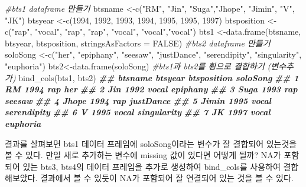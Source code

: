 \documentclass[
]{book}
\newenvironment{Shaded}{\begin{snugshade}}{\end{snugshade}}
\newcommand{\AttributeTok}[1]{\textcolor[rgb]{0.77,0.63,0.00}{#1}}
\newcommand{\CommentTok}[1]{\textcolor[rgb]{0.56,0.35,0.01}{\textit{#1}}}
\newcommand{\ConstantTok}[1]{\textcolor[rgb]{0.00,0.00,0.00}{#1}}
\newcommand{\DecValTok}[1]{\textcolor[rgb]{0.00,0.00,0.81}{#1}}
\newcommand{\DocumentationTok}[1]{\textcolor[rgb]{0.56,0.35,0.01}{\textbf{\textit{#1}}}}
\newcommand{\FunctionTok}[1]{\textcolor[rgb]{0.00,0.00,0.00}{#1}}
\newcommand{\NormalTok}[1]{#1}
\newcommand{\OtherTok}[1]{\textcolor[rgb]{0.56,0.35,0.01}{#1}}
\newcommand{\StringTok}[1]{\textcolor[rgb]{0.31,0.60,0.02}{#1}}
\theoremstyle{definition}
\theoremstyle{definition}
\theoremstyle{definition}
\theoremstyle{definition}
\theoremstyle{remark}
\begin{document}
\begin{Shaded}
\begin{Highlighting}[]
\CommentTok{\#bts1 dataframe 만들기}
\NormalTok{btsname }\OtherTok{\textless{}{-}}\FunctionTok{c}\NormalTok{(}\StringTok{"RM"}\NormalTok{, }\StringTok{"Jin"}\NormalTok{, }\StringTok{"Suga"}\NormalTok{,}\StringTok{"Jhope"}\NormalTok{, }\StringTok{"Jimin"}\NormalTok{, }\StringTok{"V"}\NormalTok{, }\StringTok{"JK"}\NormalTok{)}
\NormalTok{btsyear }\OtherTok{\textless{}{-}}\FunctionTok{c}\NormalTok{(}\DecValTok{1994}\NormalTok{, }\DecValTok{1992}\NormalTok{, }\DecValTok{1993}\NormalTok{, }\DecValTok{1994}\NormalTok{, }\DecValTok{1995}\NormalTok{, }\DecValTok{1995}\NormalTok{, }\DecValTok{1997}\NormalTok{)}
\NormalTok{btsposition }\OtherTok{\textless{}{-}}\FunctionTok{c}\NormalTok{(}\StringTok{"rap"}\NormalTok{, }\StringTok{"vocal"}\NormalTok{, }\StringTok{"rap"}\NormalTok{, }\StringTok{"rap"}\NormalTok{, }\StringTok{"vocal"}\NormalTok{, }\StringTok{"vocal"}\NormalTok{,}\StringTok{"vocal"}\NormalTok{)}
\NormalTok{bts1 }\OtherTok{\textless{}{-}}\FunctionTok{data.frame}\NormalTok{(btsname, btsyear, btsposition, }\AttributeTok{stringsAsFactors =} \ConstantTok{FALSE}\NormalTok{)}
\CommentTok{\#bts2 dataframe 만들기}
\NormalTok{soloSong }\OtherTok{\textless{}{-}}\FunctionTok{c}\NormalTok{(}\StringTok{"her"}\NormalTok{, }\StringTok{"epiphany"}\NormalTok{, }\StringTok{"seesaw"}\NormalTok{, }\StringTok{"justDance"}\NormalTok{, }\StringTok{"serendipity"}\NormalTok{, }\StringTok{"singularity"}\NormalTok{, }\StringTok{"euphoria"}\NormalTok{)}
\NormalTok{bts2}\OtherTok{\textless{}{-}}\FunctionTok{data.frame}\NormalTok{(soloSong)}
\CommentTok{\#bts1과 bts2를 횡으로 결합하기 (변수추가)}
\FunctionTok{bind\_cols}\NormalTok{(bts1, bts2)}
\DocumentationTok{\#\#   btsname btsyear btsposition    soloSong}
\DocumentationTok{\#\# 1      RM    1994         rap         her}
\DocumentationTok{\#\# 2     Jin    1992       vocal    epiphany}
\DocumentationTok{\#\# 3    Suga    1993         rap      seesaw}
\DocumentationTok{\#\# 4   Jhope    1994         rap   justDance}
\DocumentationTok{\#\# 5   Jimin    1995       vocal serendipity}
\DocumentationTok{\#\# 6       V    1995       vocal singularity}
\DocumentationTok{\#\# 7      JK    1997       vocal    euphoria}
\end{Highlighting}
\end{Shaded}

결과를 살펴보면 bts1 데이터 프레임에 soloSong이라는 변수가 잘 결합되어 있는것을 볼 수 있다. 만일 새로 추가하는 변수에 missing 값이 있다면 어떻게 될까? NA가 포함되어 있는 bts3, bts4의 데이터 프레임을 추가로 생성하여 bind\_cols를 사용하여 결합해보았다. 결과에서 볼 수 있듯이 NA가 포함되어 잘 연결되어 있는 것을 볼 수 있다.
\end{document}
